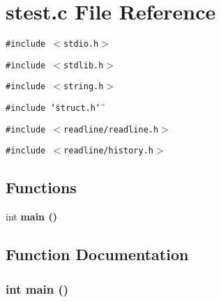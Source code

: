 \section{stest.c File Reference}
\label{stest_8c}
{\tt \#include $<$stdio.h$>$}\par
{\tt \#include $<$stdlib.h$>$}\par
{\tt \#include $<$string.h$>$}\par
{\tt \#include \char`\"{}struct.h\char`\"{}}\par
{\tt \#include $<$readline/readline.h$>$}\par
{\tt \#include $<$readline/history.h$>$}\par
\subsection*{Functions}
\begin{CompactItemize}
\item 
int \bf{main} ()
\end{CompactItemize}


\subsection{Function Documentation}
\subsubsection{\setlength{\rightskip}{0pt plus 5cm}int main ()}\label{stest_8c_e66f6b31b5ad750f1fe042a706a4e3d4}



